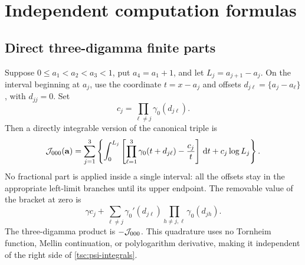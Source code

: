 \section{Independent computation formulas}\label{tsc:computation}
\subsection{Direct three-digamma finite parts}
Suppose $0\le a_1<a_2<a_3<1$, put $a_4=a_1+1$, and let
$L_j=a_{j+1}-a_j$. On the interval beginning at $a_j$, use the coordinate
$t=x-a_j$ and offsets $d_{j\ell}=\{a_j-a_\ell\}$, with $d_{jj}=0$.
Set
\[
 c_j=\prod_{\ell\ne j}\gamma_0(d_{j\ell}).
\]
Then a directly integrable version of the canonical triple is
\begin{equation}\label{tsc:direct-triple}
 \mathcal J_{000}(\mathbf a)=\sum_{j=1}^3\left\{
   \int_0^{L_j}\left[\prod_{\ell=1}^3\gamma_0(t+d_{j\ell})
                              -\frac{c_j}{t}\right]\,\mathrm d t
                          +c_j\log L_j\right\}.
\end{equation}
No fractional part is applied inside a single interval: all the offsets
stay in the appropriate left-limit branches until its upper endpoint.
The removable value of the bracket at zero is
\[
 \gamma c_j+
  \sum_{\ell\ne j}\gamma_0'(d_{j\ell})
             \prod_{h\ne j,\ell}\gamma_0(d_{jh}).
\]
The three-digamma product is $-\mathcal J_{000}$. This quadrature uses no
Tornheim function, Mellin continuation, or polylogarithm derivative, making
it independent of the right side of \eqref{tsc:psi-integrals}.

